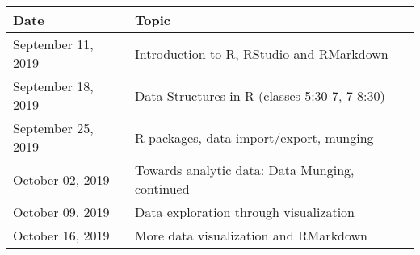 \documentclass[
]{article}
\begin{document}
\begin{longtable}[]{@{}ll@{}}
\toprule
\begin{minipage}[b]{0.17\columnwidth}\raggedright
Date\strut
\end{minipage} & \begin{minipage}[b]{0.77\columnwidth}\raggedright
Topic\strut
\end{minipage}\tabularnewline
\midrule
\endhead
\begin{minipage}[t]{0.17\columnwidth}\raggedright
September 11, 2019\strut
\end{minipage} & \begin{minipage}[t]{0.77\columnwidth}\raggedright
Introduction to R, RStudio and RMarkdown\strut
\end{minipage}\tabularnewline
\begin{minipage}[t]{0.17\columnwidth}\raggedright
September 18, 2019\strut
\end{minipage} & \begin{minipage}[t]{0.77\columnwidth}\raggedright
Data Structures in R (classes 5:30-7, 7-8:30)\strut
\end{minipage}\tabularnewline
\begin{minipage}[t]{0.17\columnwidth}\raggedright
September 25, 2019\strut
\end{minipage} & \begin{minipage}[t]{0.77\columnwidth}\raggedright
R packages, data import/export, munging\strut
\end{minipage}\tabularnewline
\begin{minipage}[t]{0.17\columnwidth}\raggedright
October 02, 2019\strut
\end{minipage} & \begin{minipage}[t]{0.77\columnwidth}\raggedright
Towards analytic data: Data Munging, continued\strut
\end{minipage}\tabularnewline
\begin{minipage}[t]{0.17\columnwidth}\raggedright
October 09, 2019\strut
\end{minipage} & \begin{minipage}[t]{0.77\columnwidth}\raggedright
Data exploration through visualization\strut
\end{minipage}\tabularnewline
\begin{minipage}[t]{0.17\columnwidth}\raggedright
October 16, 2019\strut
\end{minipage} & \begin{minipage}[t]{0.77\columnwidth}\raggedright
More data visualization and RMarkdown\strut

\end{minipage}
\end{longtable}
\end{document}
